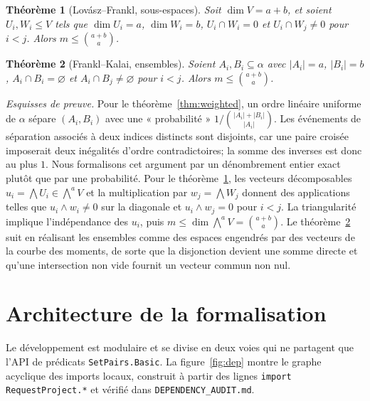 \documentclass[11pt]{article}
\newtheorem{theorem}{Théorème}
\newcommand{\bind}[2]{\binom{#1}{#2}}
\newcommand{\wedgep}[1]{\textstyle\bigwedge^{#1}}
\begin{document}
\begin{theorem}[Lovász--Frankl, sous-espaces]\label{thm:subspace}
Soit $\dim V=a+b$, et soient $U_i,W_i\le V$ tels que $\dim U_i=a$, $\dim W_i=b$,
$U_i\cap W_i=0$ et $U_i\cap W_j\neq0$ pour $i<j$. Alors
$m\le\bind{a+b}{a}$.
\end{theorem}

\begin{theorem}[Frankl--Kalai, ensembles]\label{thm:fk}
Soient $A_i,B_i\subseteq\alpha$ avec $|A_i|=a$, $|B_i|=b$,
$A_i\cap B_i=\varnothing$ et $A_i\cap B_j\neq\varnothing$ pour $i<j$. Alors
$m\le\bind{a+b}{a}$.
\end{theorem}

\noindent\emph{Esquisses de preuve.} Pour le théorème~\ref{thm:weighted}, un ordre
linéaire uniforme de $\alpha$ sépare $(A_i,B_i)$ avec une « probabilité »
$1/\bind{|A_i|+|B_i|}{|A_i|}$. Les événements de séparation associés à deux indices
distincts sont disjoints, car une paire croisée imposerait deux inégalités d'ordre
contradictoires; la somme des inverses est donc au plus $1$. Nous formalisons cet
argument par un dénombrement entier exact plutôt que par une probabilité. Pour le
théorème~\ref{thm:subspace}, les vecteurs décomposables
$u_i=\bigwedge U_i\in\wedgep{a}V$ et la multiplication par
$w_j=\bigwedge W_j$ donnent des applications telles que $u_i\wedge w_i\neq0$ sur la
diagonale et $u_i\wedge w_j=0$ pour $i<j$. La triangularité implique l'indépendance des
$u_i$, puis $m\le\dim\wedgep{a}V=\bind{a+b}{a}$. Le théorème~\ref{thm:fk} suit en
réalisant les ensembles comme des espaces engendrés par des vecteurs de la courbe des
moments, de sorte que la disjonction devient une somme directe et qu'une intersection
non vide fournit un vecteur commun non nul.

\section{Architecture de la formalisation}\label{sec:arch}

Le développement est modulaire et se divise en deux voies qui ne partagent que l'API de
prédicats \lstinline{SetPairs.Basic}. La figure~\ref{fig:dep} montre le graphe acyclique
des imports locaux, construit à partir des lignes
\lstinline{import RequestProject.*} et vérifié dans
\texttt{DEPENDENCY\_AUDIT.md}.
\end{document}
